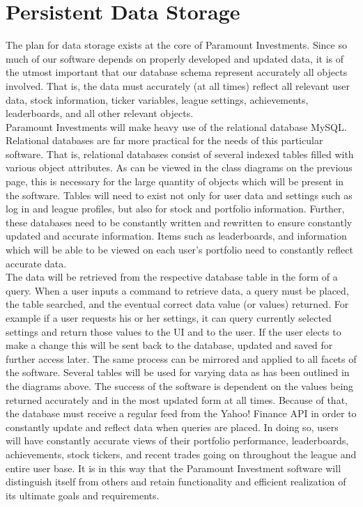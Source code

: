 \section{Persistent Data Storage}

The plan for data storage exists at the core of Paramount
Investments. Since so much of our software depends on
properly developed and updated data, it is of the utmost
important that our database schema represent accurately all
objects involved. That is, the data must accurately (at all
times) reflect all relevant user data, stock information,
ticker variables, league settings, achievements, leaderboards,
and all other relevant objects.\\

Paramount Investments will make heavy use of the relational
database MySQL. Relational databases are far more practical
for the needs of this particular software. That is, relational
databases consist of several indexed tables filled with
various object attributes. As can be viewed in the class
diagrams on the previous page, this is necessary for the
large quantity of objects which will be present in the
software. Tables will need to exist not only for user data
and settings such as log in and league profiles, but also
for stock and portfolio information. Further, these databases
need to be constantly written and rewritten to ensure
constantly updated and accurate information. Items such
as leaderboards, and information which will be able to be
viewed on each user’s portfolio need to constantly reflect
accurate data.\\

The data will be retrieved from the respective database table
in the form of a query. When a user inputs a command to retrieve
data, a query must be placed, the table searched, and the eventual
correct data value (or values) returned. For example if a user
requests his or her settings, it can query currently selected
settings and return those values to the UI and to the user. If
the user elects to make a change this will be sent back to the
database, updated and saved for further access later. The same
process can be mirrored and applied to all facets of the software.
Several tables will be used for varying data as has been outlined in the diagrams above. The success of the software is dependent on the values being returned accurately and in the most updated form at all times. Because of that, the database must receive a regular feed from the Yahoo! Finance API in order to constantly update and reflect data when queries are placed. In doing so, users will have constantly accurate views of their portfolio performance, leaderboards, achievements, stock tickers, and recent trades going on throughout the league and entire user base. It is in this way that the Paramount Investment software will distinguish itself from others and retain functionality and efficient realization of its ultimate goals and requirements.

